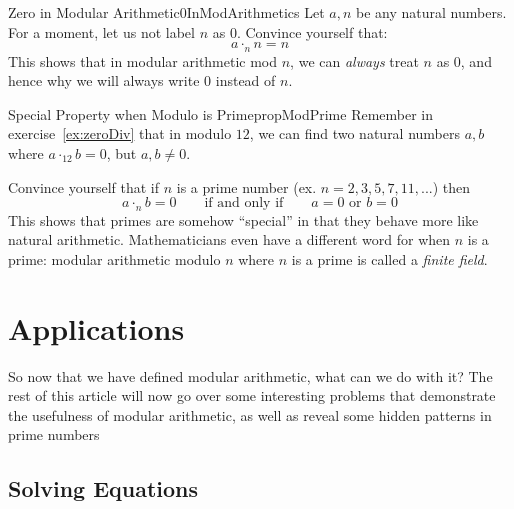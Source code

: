 \documentclass[oneside]{book}
\begin{document}
\begin{exercise}{Zero in Modular Arithmetic}{0InModArithmetics}
  Let $a,n$ be any natural numbers. For a moment, let us not label $n$ as $0$. Convince yourself that:
  \[
    a\cdot_{n}n = n
  \]
  This shows that in modular arithmetic mod $n$, we can \emph{always} treat $n$ as $0$, and hence why we
  will always write $0$ instead of $n$.
\end{exercise}


\begin{exercise}{Special Property when Modulo is Prime}{propModPrime}
  Remember in exercise~\ref{ex:zeroDiv} that in modulo $12$, we can find two natural numbers $a,b$ where
  $a\cdot_{12} b= 0$, but $a,b\ne 0$.

  Convince yourself that if $n$ is a prime number (ex. $n = 2,3,5,7,11,...$) then
  \[
    a\cdot_n b = 0 \qquad \text{if and only if} \qquad a = 0\text{ or } b= 0
  \]
  This shows that primes are somehow ``special'' in that they behave more like natural arithmetic. Mathematicians even have a different word for when $n$
  is a prime: modular arithmetic modulo $n$ where $n$ is a prime is called a \emph{finite field}.
\end{exercise}

\newpage
\chapter*{Applications}

So now that we have defined modular arithmetic, what can we do with it? The rest of this article will now go
over some interesting problems that demonstrate the usefulness of modular arithmetic, as well as reveal some
hidden patterns in prime numbers

\section{Solving Equations}
\end{document}
